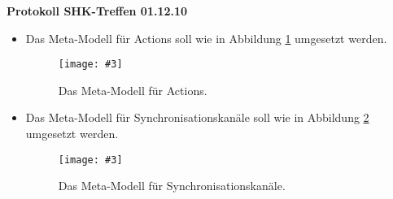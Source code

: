 \documentclass[11pt,a4paper]{article}
\newcommand{\inclpic}[5]{\begin{figure}[#1]\begin{center}\texttt{[image: \#3]}\caption{#4}\label{pic:#5}\end{center}\end{figure}}
\begin{document}
\begin{center}

\textbf{\huge Protokoll SHK-Treffen 01.12.10}\\[0.9cm]

\end{center}

\begin{itemize}
  \item Das Meta-Modell für Actions soll wie in Abbildung \ref{pic:actions-MM}
  umgesetzt werden. \inclpic{ht}{0.71}{./images/SNC00027.jpg}{Das
  Meta-Modell für Actions.}{actions-MM}
  \item Das Meta-Modell für Synchronisationskanäle soll wie in Abbildung
  \ref{pic:channel-MM} umgesetzt werden.
  \inclpic{ht}{0.71}{./images/SNC00031.jpg}{Das Meta-Modell für
  Synchronisationskanäle.}{channel-MM}
\end{itemize}
\end{document}
